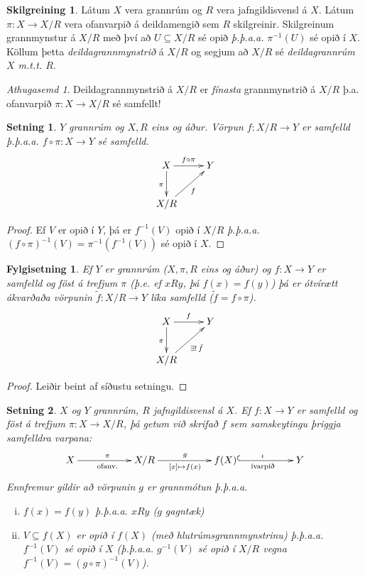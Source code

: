 \documentclass[a4paper,icelandic]{book}
\theoremstyle{definition}
\newtheorem{skilgr}{Skilgreining}[section]
\theoremstyle{plain}
\newtheorem{setn}{Setning}[section]
\newtheorem{fylgisetn}{Fylgisetning}[section]
\theoremstyle{remark}
\newtheorem*{ath}{Athugasemd}
\begin{document}
\begin{skilgr}
  Látum $X$ vera grannrúm og $R$ vera jafngildisvensl á $X$. Látum $\pi: X\to
  X/R$ vera ofanvarpið á deildamengið sem $R$ skilgreinir. Skilgreinum
  grannmynstur á $X/R$ með því að $U\subseteq X/R$ sé opið \emph{þ.þ.a.a.}
  $\pi^{-1}(U)$ sé opið í $X$. Köllum þetta
  \emph{deildagrannmynstrið} á $X/R$ og segjum að
  $X/R$ sé \emph{deildagrannrúm $X$ m.t.t. $R$}.
\end{skilgr}
\begin{ath}
  Deildagrannmynstrið á $X/R$ er \emph{fínasta} grannmynstrið á $X/R$ þ.a.
  ofanvarpið $\pi: X\to X/R$ sé samfellt!
\end{ath}
\begin{setn}
  $Y$ grannrúm og $X,R$ eins og áður. Vörpun $f:X/R\to Y$ er samfelld
  \emph{þ.þ.a.a.} $f\circ \pi: X\to Y$ sé samfelld.
  \[
  \xymatrix{
  X\ar[d]_\pi \ar[r]^{f\circ\pi}&  Y\\
  X/R \ar[ur]_f &
  }
  \]
\end{setn}
\begin{proof}
  Ef $V$ er opið í $Y$, þá er $f^{-1}(V)$ opið í $X/R$ \emph{þ.þ.a.a.}
  $(f\circ \pi)^{-1}(V) = \pi^{-1}(f^{-1}(V))$ sé opið í $X$.
\end{proof}
\begin{fylgisetn}
  Ef $Y$ er grannrúm ($X,\pi,R$ eins og áður) og $f:X\to Y$ er samfelld og föst
  á trefjum $\pi$ (þ.e. ef $xRy$, þá $f(x) = f(y)$) þá er ótvírætt ákvarðaða
  vörpunin $\tilde f : X/R \to Y$ líka samfelld ($\tilde f = f\circ\pi$).\[
  \xymatrix{
  X \ar[r]^f\ar[d]_\pi & Y\\
  X/R\ar[ur]_{\exists!\,\tilde f} &
  }
  \]
\end{fylgisetn}
\begin{proof}
  Leiðir beint af síðustu setningu.
\end{proof}
\begin{setn}
  $X$ og $Y$ grannrúm, $R$ jafngildisvensl á $X$. Ef $f:X\to Y$ er samfelld og
  föst á trefjum $\pi:X\to X/R$, þá getum við skrifað $f$ sem samskeytingu
  þriggja samfelldra varpana:
 \[
 \xymatrix{
 X       \ar[rr]^\pi_{\text{ofanv.}}           &&
 X/R   \ar[rr]^g_{[x]\mapsto f(x)}             &&
 f(X)  \ar@{^{(}->}[rr]^\iota_{\text{ívarpið}} &&
 Y
 }
 \]
 Ennfremur gildir að vörpunin $g$ er grannmótun \emph{þ.þ.a.a.}
 \begin{enumerate}[(i)]
   \item $f(x)=f(y)$ \emph{þ.þ.a.a.} $xRy$ ($g$ gagntæk)
   \item $V\subseteq f(X)$ er opið í $f(X)$ (með hlutrúmsgrannmynstrinu)
     \emph{þ.þ.a.a.} $f^{-1}(V)$ sé opið í $X$ (\emph{þ.þ.a.a.} $g^{-1}(V)$ sé
     opið í $X/R$ vegna $f^{-1}(V) = (g\circ \pi)^{-1}(V)$). 
 \end{enumerate}
\end{setn}
\end{document}
